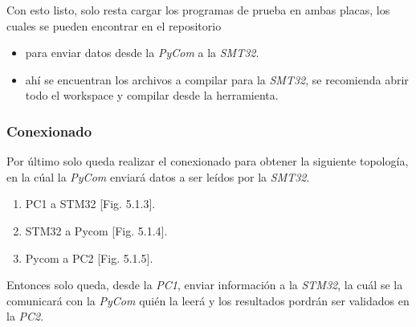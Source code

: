 \documentclass[12pt]{article}
\begin{document}
Con esto listo, solo resta cargar los programas de prueba en ambas placas, los cuales se pueden encontrar en el repositorio
\begin{itemize}
  \item {} para enviar datos desde la \textit{PyCom} a la \textit{SMT32}.
  \item {} ahí se encuentran los archivos a compilar para la \textit{SMT32}, se recomienda abrir todo el workspace y compilar desde la herramienta.
\end{itemize}

\subsubsection{Conexionado}

Por último solo queda realizar el conexionado para obtener la siguiente topología, en la cúal la \textit{PyCom} enviará datos a ser leídos por la \textit{SMT32}.

\begin{enumerate}
  \item PC1 a STM32 [Fig. 5.1.3].
  \item STM32 a Pycom  [Fig. 5.1.4].
  \item Pycom a PC2 [Fig. 5.1.5].
\end{enumerate}

Entonces solo queda, desde la \textit{PC1}, enviar información a la \textit{STM32}, la cuál se la comunicará con la \textit{PyCom} quién la leerá y los resultados pordrán ser validados en la \textit{PC2}.
\end{document}
